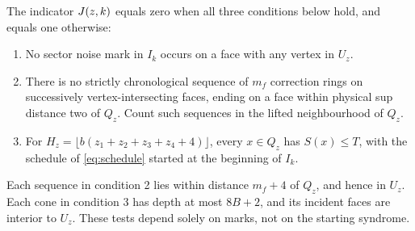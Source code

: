 \begin{definition}\label{def:bad}
The indicator \(J(z,k)\) equals zero when all three conditions below
hold, and equals one otherwise:
\begin{enumerate}
\item No sector noise mark in \(I_k\) occurs on a face with any vertex
in \(U_z\).
\item There is no strictly chronological sequence of \(m_f\) correction
rings on successively vertex-intersecting faces, ending on a face
within physical sup distance two of \(Q_z\). Count such sequences
in the lifted neighbourhood of \(Q_z\).
\item For
\(H_z=\lfloor b(z_1+z_2+z_3+z_4+4)\rfloor\), every \(x\in Q_z\)
has \(S(x)\le T\), with the schedule of
\eqref{eq:schedule} started at the beginning of \(I_k\).
\end{enumerate}
\end{definition}

Each sequence in condition 2 lies within distance \(m_f+4\) of
\(Q_z\), and hence in \(U_z\). Each cone in condition 3 has depth
at most \(8B+2\), and its incident faces are interior to \(U_z\).
These tests depend solely on marks, not on the starting syndrome.

